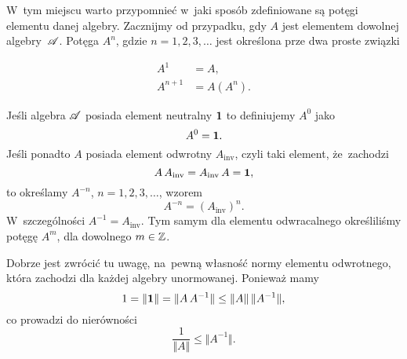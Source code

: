 \documentclass[a4paper,11pt]{article}
\begin{document}
\noindent
{} W~tym miejscu warto przypomnieć w~jaki sposób zdefiniowane są
potęgi elementu danej algebry. Zacznijmy od przypadku, gdy $A$ jest
elementem dowolnej algebry~$\mathcal{A}$. Potęga $A^{ n }$, gdzie
$n = 1, 2, 3, \ldots$ jest określona prze dwa proste związki

\vspace{\negVerSpaceFour}


\begin{subequations}

  \begin{align}
    \label{eq:Bratteli-Robinson-Operator-Algebras-ETC-Vol-I-s01-14-A}
    A^{ 1 } &= A, \\
    \label{eq:Bratteli-Robinson-Operator-Algebras-ETC-Vol-I-s01-14-B}
    A^{ n + 1 } &= A ( A^{ n } ).
  \end{align}

\end{subequations}


\noindent
Jeśli algebra $\mathcal{A}$ posiada element neutralny $\mathbf{1}$ to definiujemy
$A^{ 0 }$ jako
\begin{equation}
  \label{eq:Bratteli-Robinson-Operator-Algebras-ETC-Vol-I-s01-15}
  A^{ 0 } = \mathbf{1}.
\end{equation}
Jeśli ponadto $A$ posiada element odwrotny $A_{ \textrm{inv} }$, czyli taki
element, że~zachodzi
\begin{equation}
  \label{eq:Bratteli-Robinson-Operator-Algebras-ETC-Vol-I-s01-16}
  A \, A_{ \textrm{inv} } = A_{ \textrm{inv} } \, A = \mathbf{1},
\end{equation}
to określamy $A^{ -n }$, $n = 1, 2, 3, \ldots$, wzorem
\begin{equation}
  \label{eq:Bratteli-Robinson-Operator-Algebras-ETC-Vol-I-s01-17}
  A^{ -n } = ( A_{ \textrm{inv} } )^{ n }.
\end{equation}
W~szczególności $A^{ -1 } = A_{ \textrm{inv} }$. Tym samym dla elementu
odwracalnego określiliśmy potęgę $A^{ m }$, dla dowolnego $m \in \mathbb{Z}$.

\vspace{\VerSpaceFour}





\noindent
{} Dobrze jest zwrócić tu uwagę, na~pewną własność normy elementu
odwrotnego, która zachodzi dla każdej algebry unormowanej. Ponieważ mamy
\begin{equation}
  \label{eq:Bratteli-Robinson-Operator-Algebras-ETC-Vol-I-s01-18}
  1 = \Vert \mathbf{1} \Vert = \Vert A \, A^{ -1 } \Vert \leq \Vert A \Vert \, \Vert A^{ -1 } \Vert,
\end{equation}
co prowadzi do nierówności
\begin{equation}
  \label{eq:Bratteli-Robinson-Operator-Algebras-ETC-Vol-I-s01-19}
  \frac{ 1 }{ \Vert A \Vert } \leq \Vert A^{ -1 } \Vert.
\end{equation}
\end{document}
